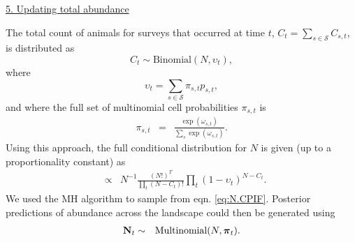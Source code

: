 \documentclass[12pt,fleqn]{article}
\begin{document}
\begin{flushleft}
\underline{5. Updating total abundance}

The total count of animals for surveys that occurred at time $t$, $C_t = \sum_{s \in \mathcal{S}} C_{s,t}$,
is distributed as
\begin{equation*}
  C_t \sim \textrm{Binomial}(N,\upsilon_t),
\end{equation*}
where
\begin{equation*}
  \upsilon_t= \sum_{s \in \mathcal{S}} \pi_{s,t} p_{s,t},
\end{equation*}
and where the full set of multinomial cell probabilities $\pi_{s,t}$ is
\begin{eqnarray*}
  \pi_{s,t} & = & \frac{ \exp(\omega_{s,t})}{\sum_s \exp(\omega_{s,t})}.
\end{eqnarray*}
Using this approach, the full conditional distribution for $N$ is given (up to a proportionality constant) as
\begin{eqnarray}
  [N | \cdot] & \propto & N^{-1} \frac{(N!)^T}{\prod_t (N-C_t)!}\prod_t (1-\upsilon_t)^{N-C_t}.
  \label{eq:N.CPIF}
\end{eqnarray}
We used the MH algorithm to sample from eqn. \ref{eq:N.CPIF}.  Posterior predictions of abundance across the landscape could then be generated using
\begin{eqnarray*}
  {\bf N}_{t} & \sim & \textrm{Multinomial}(N,\boldsymbol{\pi}_t).
\end{eqnarray*}



\renewcommand{\refname}{Literature Cited}




\end{flushleft}
\end{document}
